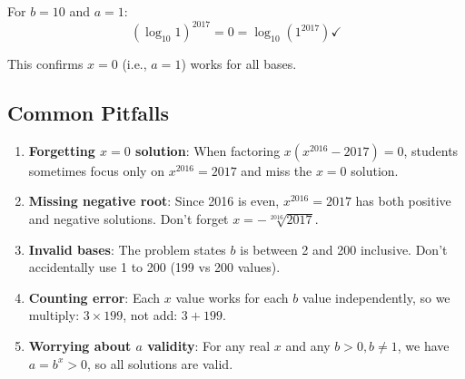 \documentclass[]{article}
\begin{document}
\begin{solutionbox}
For $b=10$ and $a=1$:
\[(\log_{10} 1)^{2017} = 0 = \log_{10}(1^{2017}) \checkmark\]

This confirms $x=0$ (i.e., $a=1$) works for all bases.

\subsection*{Common Pitfalls}

\begin{enumerate}
    \item \textbf{Forgetting $x=0$ solution}: When factoring $x(x^{2016} - 2017) = 0$, students sometimes focus only on $x^{2016} = 2017$ and miss the $x=0$ solution.
    
    \item \textbf{Missing negative root}: Since 2016 is even, $x^{2016} = 2017$ has both positive and negative solutions. Don't forget $x = -\sqrt[2016]{2017}$.
    
    \item \textbf{Invalid bases}: The problem states $b$ is between 2 and 200 inclusive. Don't accidentally use 1 to 200 (199 vs 200 values).
    
    \item \textbf{Counting error}: Each $x$ value works for each $b$ value independently, so we multiply: $3 \times 199$, not add: $3 + 199$.
    
    \item \textbf{Worrying about $a$ validity}: For any real $x$ and any $b > 0, b \neq 1$, we have $a = b^x > 0$, so all solutions are valid.
\end{enumerate}
\end{solutionbox}
\end{document}
